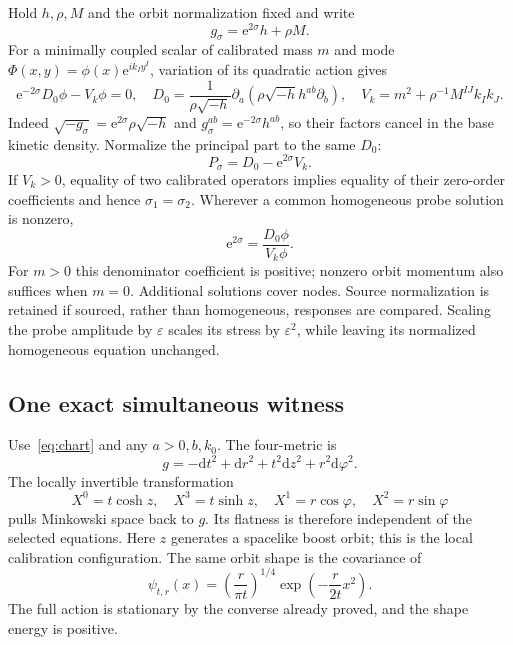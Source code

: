 \documentclass[11pt]{article}
\newcommand{\dd}{\mathrm d}
\newcommand{\vol}{\sqrt{-h}}
\newcommand{\e}{\mathrm e}
\begin{document}
Hold $h,\rho,M$ and the orbit normalization fixed and write
\begin{equation}
 g_\sigma=\e^{2\sigma}h+\rho M.
\end{equation}
For a minimally coupled scalar of calibrated mass $m$ and mode $\Phi(x,y)=\phi(x)\e^{ik_Iy^I}$, variation of its quadratic action gives
\begin{equation}
 \e^{-2\sigma}D_0\phi-V_k\phi=0,
 \quad D_0=\frac1{\rho\vol}\partial_a(\rho\vol h^{ab}\partial_b),
 \quad V_k=m^2+\rho^{-1}M^{IJ}k_Ik_J.
\end{equation}
Indeed $\sqrt{-g_\sigma}=\e^{2\sigma}\rho\vol$ and $g_\sigma^{ab}=\e^{-2\sigma}h^{ab}$, so their factors cancel in the base kinetic density. Normalize the principal part to the same $D_0$:
\begin{equation}\label{eq:probe}
 P_\sigma=D_0-\e^{2\sigma}V_k.
\end{equation}
If $V_k>0$, equality of two calibrated operators implies equality of their zero-order coefficients and hence $\sigma_1=\sigma_2$. Wherever a common homogeneous probe solution is nonzero,
\begin{equation}
 \e^{2\sigma}=\frac{D_0\phi}{V_k\phi}.
\end{equation}
For $m>0$ this denominator coefficient is positive; nonzero orbit momentum also suffices when $m=0$. Additional solutions cover nodes. Source normalization is retained if sourced, rather than homogeneous, responses are compared. Scaling the probe amplitude by $\varepsilon$ scales its stress by $\varepsilon^2$, while leaving its normalized homogeneous equation unchanged.

\subsection{One exact simultaneous witness}

Use~\eqref{eq:chart} and any $a>0,b,k_0$. The four-metric is
\begin{equation}
 g=-\dd t^2+\dd r^2+t^2\dd z^2+r^2\dd\varphi^2.
\end{equation}
The locally invertible transformation
\begin{equation}
 X^0=t\cosh z,\quad X^3=t\sinh z,\quad
 X^1=r\cos\varphi,\quad X^2=r\sin\varphi
\end{equation}
pulls Minkowski space back to $g$. Its flatness is therefore independent of the selected equations. Here $z$ generates a spacelike boost orbit; this is the local calibration configuration. The same orbit shape is the covariance of
\begin{equation}
 \psi_{t,r}(x)=\left(\frac r{\pi t}\right)^{1/4}\exp\left(-\frac r{2t}x^2\right).
\end{equation}
The full action is stationary by the converse already proved, and the shape energy is positive.
\end{document}
